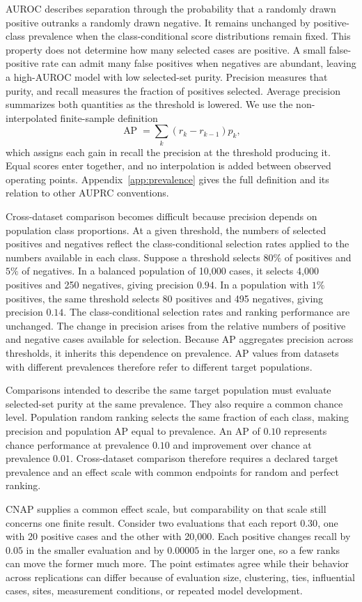 \documentclass[11pt]{article}
\newcommand{\AP}{\operatorname{AP}}
\theoremstyle{remark}
\begin{document}
AUROC describes separation through the probability that a randomly drawn positive outranks a randomly drawn negative. It remains unchanged by positive-class prevalence when the class-conditional score distributions remain fixed. This property does not determine how many selected cases are positive. A small false-positive rate can admit many false positives when negatives are abundant, leaving a high-AUROC model with low selected-set purity. Precision measures that purity, and recall measures the fraction of positives selected. Average precision summarizes both quantities as the threshold is lowered. We use the non-interpolated finite-sample definition
\[
\AP
=
\sum_k (r_k-r_{k-1})p_k,
\]
which assigns each gain in recall the precision at the threshold producing it. Equal scores enter together, and no interpolation is added between observed operating points. Appendix~\ref{app:prevalence} gives the full definition and its relation to other AUPRC conventions.

Cross-dataset comparison becomes difficult because precision depends on population class proportions. At a given threshold, the numbers of selected positives and negatives reflect the class-conditional selection rates applied to the numbers available in each class. Suppose a threshold selects $80\%$ of positives and $5\%$ of negatives. In a balanced population of 10,000 cases, it selects 4,000 positives and 250 negatives, giving precision $0.94$. In a population with $1\%$ positives, the same threshold selects 80 positives and 495 negatives, giving precision $0.14$. The class-conditional selection rates and ranking performance are unchanged. The change in precision arises from the relative numbers of positive and negative cases available for selection. Because AP aggregates precision across thresholds, it inherits this dependence on prevalence. AP values from datasets with different prevalences therefore refer to different target populations.

Comparisons intended to describe the same target population must evaluate selected-set purity at the same prevalence. They also require a common chance level. Population random ranking selects the same fraction of each class, making precision and population AP equal to prevalence. An AP of $0.10$ represents chance performance at prevalence $0.10$ and improvement over chance at prevalence $0.01$. Cross-dataset comparison therefore requires a declared target prevalence and an effect scale with common endpoints for random and perfect ranking.

CNAP supplies a common effect scale, but comparability on that scale still concerns one finite result. Consider two evaluations that each report $0.30$, one with 20 positive cases and the other with 20,000. Each positive changes recall by $0.05$ in the smaller evaluation and by $0.00005$ in the larger one, so a few ranks can move the former much more. The point estimates agree while their behavior across replications can differ because of evaluation size, clustering, ties, influential cases, sites, measurement conditions, or repeated model development.
\end{document}
